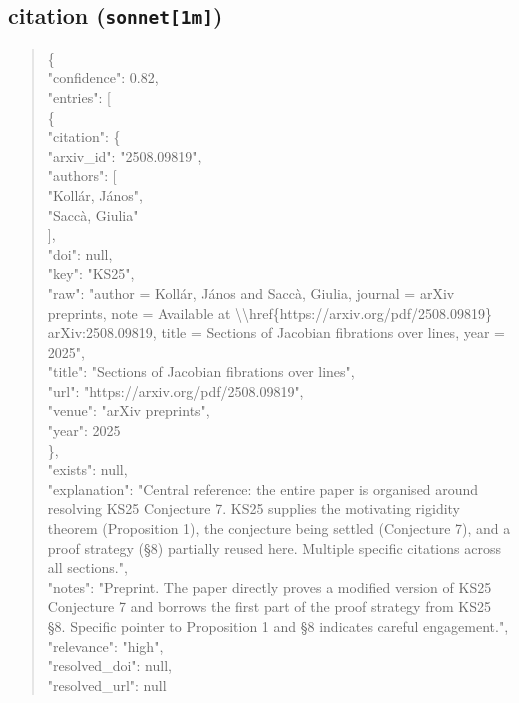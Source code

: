 \documentclass[11pt]{article}
\begin{document}
\subsection*{citation (\texttt{sonnet[1m]})}
\begin{quote}\small\ttfamily\raggedright
\{\\
  "confidence": 0.82,\\
  "entries": [\\
    \{\\
      "citation": \{\\
        "arxiv\_id": "2508.09819",\\
        "authors": [\\
          "Kollár, János",\\
          "Saccà, Giulia"\\
        ],\\
        "doi": null,\\
        "key": "KS25",\\
        "raw": "author = Kollár, János and Saccà, Giulia, journal = arXiv preprints, note = Available at \textbackslash{}\textbackslash{}href\{https://arxiv.org/pdf/2508.09819\} arXiv:2508.09819, title = Sections of Jacobian fibrations over lines, year = 2025",\\
        "title": "Sections of Jacobian fibrations over lines",\\
        "url": "https://arxiv.org/pdf/2508.09819",\\
        "venue": "arXiv preprints",\\
        "year": 2025\\
      \},\\
      "exists": null,\\
      "explanation": "Central reference: the entire paper is organised around resolving KS25 Conjecture 7. KS25 supplies the motivating rigidity theorem (Proposition 1), the conjecture being settled (Conjecture 7), and a proof strategy (§8) partially reused here. Multiple specific citations across all sections.",\\
      "notes": "Preprint. The paper directly proves a modified version of KS25 Conjecture 7 and borrows the first part of the proof strategy from KS25 §8. Specific pointer to Proposition 1 and §8 indicates careful engagement.",\\
      "relevance": "high",\\
      "resolved\_doi": null,\\
      "resolved\_url": null\\

\end{quote}
\end{document}
